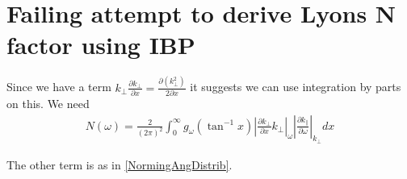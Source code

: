 \documentclass[]{article}
\begin{document}
\newpage
\appendix
\section{Failing attempt to derive Lyons N factor using IBP}
Since we have a term $k_\perp  \frac{\partial k_\perp}{\partial x}= \frac{\partial (k_\perp^2)}{2 \partial x}$ it suggests we can use integration by parts on this. We need
\begin{align}
N(\omega) = \frac{2}{(2\pi)^2} \int_0^\infty g_\omega( \tan^{-1} x ) \left| \frac{\partial k_\perp}{\partial x}k_\perp\right|_\omega \left| \frac{\partial k_\parallel}{\partial \omega}\right|_{k_\perp}   d x
\end{align}

The other term is as in \ref{NormingAngDistrib}.
\end{document}
